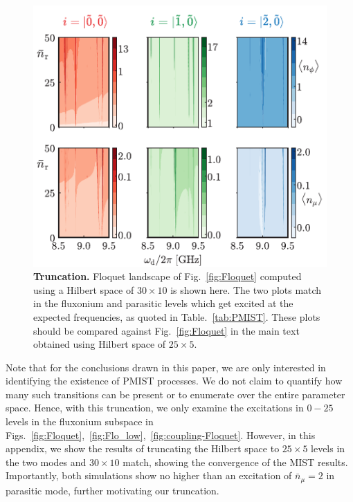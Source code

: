\documentclass[%
reprint,
superscriptaddress,
 amsmath,amssymb,
 aps,
 prx,
longbibliography,
floatfix,
]{revtex4-2}
\begin{document}
\begin{figure}[t]
        \centering
        \includegraphics[width=\linewidth]{Supp_Fig/Tuncation.pdf}
        \caption{{\bf Truncation.} Floquet landscape of Fig.~\ref{fig:Floquet} computed using a Hilbert space of $30\times 10$ is shown here. The two plots match in the fluxonium and parasitic levels which get excited at the expected frequencies, as quoted in Table.~\ref{tab:PMIST}. These plots should be compared against Fig.~\ref{fig:Floquet} in the main text obtained using Hilbert space of $25\times 5$.%
        }
        \label{fig:truncation}
    \end{figure}
    Note that for the conclusions drawn in this paper, we are only interested in identifying the existence of PMIST processes. We do not claim to quantify how many such transitions can be present or to enumerate over the entire parameter space. Hence, with this truncation, we only examine the excitations in $0-25$ levels in the fluxonium subspace in Figs.~\ref{fig:Floquet},~\ref{fig:Flo_low},~\ref{fig:coupling-Floquet}. However, in this appendix, we show the results of truncating the Hilbert space to $25
    \times 5$ levels in the two modes and $30
    \times 10$ match, showing the convergence of the MIST results. Importantly, both simulations show no higher than an excitation of $\bar n_\mu=2$ in parasitic mode, further motivating our truncation.
\end{document}
